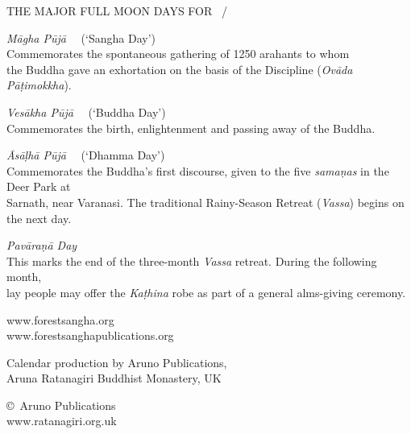 {{{\large THE MAJOR FULL MOON DAYS FOR \theCalendarYear\ / \theCalendarAltYear}

\emph{Māgha Pūjā} \spacedcdot\ \dateTextFullMaghaPuja\ (`Sangha Day')\\
Commemorates the spontaneous gathering of 1250 arahants to whom\\
the Buddha gave an exhortation on the basis of the Discipline (\emph{Ovāda Pāṭimokkha}).

\emph{Vesākha Pūjā} \spacedcdot\ \dateTextFullVesakhaPuja\ (`Buddha Day')\\
Commemorates the birth, enlightenment and passing away of the Buddha.

\emph{Āsāḷhā Pūjā} \spacedcdot\ \dateTextFullAsalhaPuja\ (`Dhamma Day')\\
Commemorates the Buddha's first discourse, given to the five \emph{samaṇas} in the Deer Park at\\
Sarnath, near Varanasi. The traditional Rainy-Season Retreat (\emph{Vassa}) begins on the next day.

\emph{Pavāraṇā Day} \spacedcdot\ \dateTextFullPavarana\\
This marks the end of the three-month \emph{Vassa} retreat. During the following month,\\
lay people may offer the \emph{Kaṭhina} robe as part of a general alms-giving ceremony.

\vspace{0.3\baselineskip}

www.forestsangha.org\\
www.forestsanghapublications.org

Calendar production by Aruno Publications,\\
Aruna Ratanagiri Buddhist Monastery, UK

\copyright\ Aruno Publications \theCopyrightYear\\
www.ratanagiri.org.uk

\vspace{0.9\baselineskip}

}

}%


